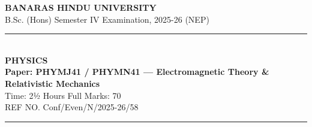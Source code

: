 \documentclass[11pt,a4paper]{article}
\begin{document}
\begin{center}
  {\large\bfseries BANARAS HINDU UNIVERSITY}\\[2pt]
  {\normalsize B.Sc. (Hons) Semester IV Examination, 2025-26 (NEP)}\\[6pt]
  \rule{0.8\linewidth}{0.5pt}\\[6pt]
  {\large\bfseries PHYSICS}\\[4pt]
  {\large\bfseries Paper: PHYMJ41 / PHYMN41 --- Electromagnetic Theory \& Relativistic Mechanics}\\[4pt]
  {\normalsize Time: 2½ Hours \hfill Full Marks: 70}\\[2pt]
  {\small REF NO. Conf/Even/N/2025-26/58}
\end{center}
\rule{\linewidth}{0.4pt}
\smallskip
\end{document}
